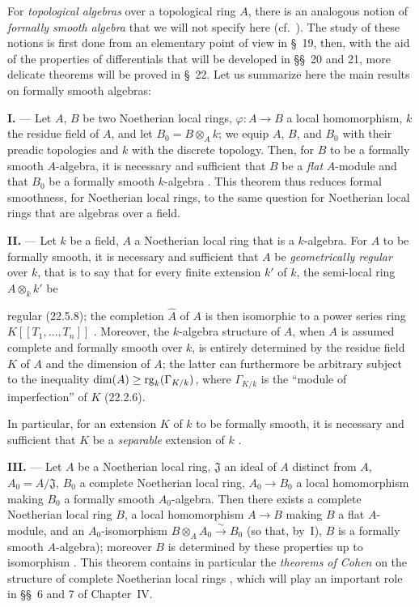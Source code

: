 \begin{env}[19.0.2]
\label{0.19.0.2}
For \emph{topological algebras} over a topological ring $A$, there is an analogous notion of \emph{formally smooth algebra} that we will not specify here (cf.~).
The study of these notions is first done from an elementary point of view in \S~19, then, with the aid of the properties of differentials that will be developed in \S\S~20 and 21, more delicate theorems will be proved in \S~22.
Let us summarize here the main results on formally smooth algebras:

\medskip\noindent\textbf{I.} ---
Let $A$, $B$ be two Noetherian local rings, $\varphi:A\to B$ a local homomorphism, $k$ the residue field of $A$, and let $B_0=B\otimes_A k$;
we equip $A$, $B$, and $B_0$ with their preadic topologies and $k$ with the discrete topology.
Then, for $B$ to be a formally smooth $A$-algebra, it is necessary and sufficient that $B$ be a \emph{flat} $A$-module and that $B_0$ be a formally smooth $k$-algebra .
This theorem thus reduces formal smoothness, for Noetherian local rings, to the same question for Noetherian local rings that are algebras over a field.

\medskip\noindent\textbf{II.} ---
Let $k$ be a field, $A$ a Noetherian local ring that is a $k$-algebra.
For $A$ to be formally smooth, it is necessary and sufficient that $A$ be \emph{geometrically regular} over $k$, that is to say that for every finite extension $k'$ of $k$, the semi-local ring $A\otimes_k k'$ be


regular (22.5.8); the completion $\widehat{A}$ of $A$ is then isomorphic to a power series ring $K[[T_1,\ldots,T_n]]$ .
Moreover, the $k$-algebra structure of $A$, when $A$ is assumed complete and formally smooth over $k$, is entirely determined by the residue field $K$ of $A$ and the dimension of $A$;
the latter can furthermore be arbitrary subject to the inequality $\dim(A)\geq\operatorname{rg}_k(\Gamma_{K/k})$, where $\Gamma_{K/k}$ is the ``module of imperfection'' of $K$ (22.2.6).

In particular, for an extension $K$ of $k$ to be formally smooth, it is necessary and sufficient that $K$ be a \emph{separable} extension of $k$ .

\medskip\noindent\textbf{III.} ---
Let $A$ be a Noetherian local ring, $\mathfrak{J}$ an ideal of $A$ distinct from $A$, $A_0=A/\mathfrak{J}$, $B_0$ a complete Noetherian local ring, $A_0\to B_0$ a local homomorphism making $B_0$ a formally smooth $A_0$-algebra.
Then there exists a complete Noetherian local ring $B$, a local homomorphism $A\to B$ making $B$ a flat $A$-module, and an $A_0$-isomorphism $B\otimes_A A_0\xrightarrow{\sim}B_0$ (so that, by~I), $B$ is a formally smooth $A$-algebra);
moreover $B$ is determined by these properties up to isomorphism .
This theorem contains in particular the \emph{theorems of Cohen} on the structure of complete Noetherian local rings , which will play an important role in \S\S~6 and 7 of Chapter~IV.


\end{env}
